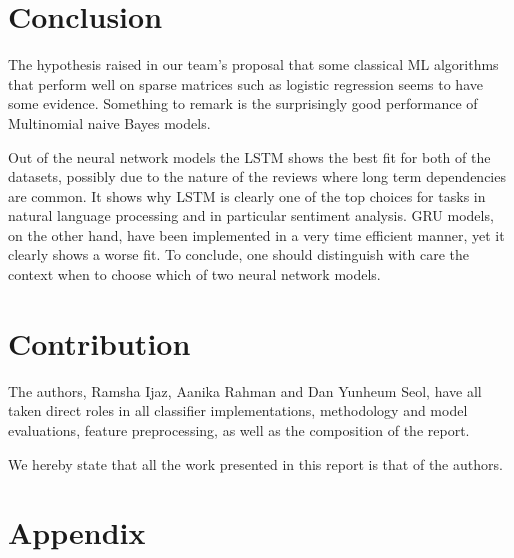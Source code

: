 \documentclass[comsoc,conference]{IEEEtran}
\begin{document}
\section{Conclusion}
\par The hypothesis raised in our team's proposal that some classical ML algorithms that perform well on sparse matrices such as logistic regression seems to have some evidence. Something to remark is the surprisingly good performance of Multinomial naive Bayes models.
\par Out of the neural network models the LSTM shows the best fit for both of the datasets, possibly due to the nature of the reviews where long term dependencies are common. It shows why LSTM is clearly one of the top choices for tasks in natural language processing and in particular sentiment analysis. GRU models, on the other hand, have been implemented in a very time efficient manner, yet it clearly shows a worse fit. To conclude, one should distinguish with care the context when  to choose which  of two neural network models.

\section{Contribution} 
The authors, Ramsha Ijaz, Aanika Rahman and Dan Yunheum Seol, have all taken direct roles in all classifier implementations, methodology and model evaluations, feature preprocessing, as well as the composition of the report. 

We hereby state that all the work presented in this report is that of the authors.

\newpage \no
\section*{Appendix}
\end{document}
